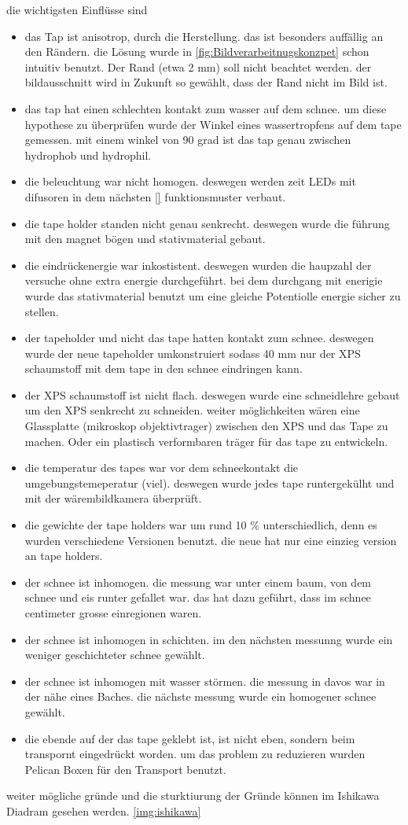 die wichtigsten Einflüsse sind
\begin{itemize}
\item das Tap ist anisotrop, durch die Herstellung. das ist besonders auffällig an den Rändern. die Lösung wurde in \ref{fig:Bildverarbeitnugskonzpet} schon intuitiv benutzt. Der Rand (etwa 2 mm) soll nicht beachtet werden. der bildausschnitt wird in Zukunft so gewählt, dass der Rand nicht im Bild ist.
\item das tap hat einen schlechten kontakt zum wasser auf dem schnee. um diese hypothese zu überprüfen wurde der Winkel eines wassertropfens auf dem tape gemessen. mit einem winkel von 90 grad ist das tap genau zwischen hydrophob und hydrophil.
\item die beleuchtung war nicht homogen. deswegen werden zeit LEDs mit difusoren in dem nächsten \ref{} funktionsmuster verbaut.
\item die tape holder standen nicht genau senkrecht. deswegen wurde die führung mit den magnet bögen und stativmaterial gebaut.
\item die eindrückenergie war inkostistent. deswegen wurden die haupzahl der versuche ohne extra energie durchgeführt. bei dem durchgang mit enerigie wurde das stativmaterial benutzt um eine gleiche Potentiolle energie sicher zu stellen.
\item der tapeholder und nicht das tape hatten kontakt zum schnee. deswegen wurde der neue tapeholder umkonstruiert sodass 40 mm nur der XPS schaumstoff mit dem tape in den schnee eindringen kann.
\item der XPS schaumstoff ist nicht flach. deswegen wurde eine schneidlehre gebaut um den XPS senkrecht  zu schneiden. weiter möglichkeiten wären eine Glassplatte (mikroskop objektivtrager) zwischen den XPS und das Tape zu machen. Oder ein plastisch verformbaren träger für das tape zu entwickeln.
\item die temperatur des tapes war vor dem schneekontakt die umgebungstemeperatur (viel). deswegen wurde jedes tape runtergekülht und mit der wärembildkamera überprüft.
\item die gewichte der tape holders war um rund 10 \% unterschiedlich, denn es wurden verschiedene Versionen benutzt. die neue hat nur eine einzieg version an tape holders.
\item der schnee ist inhomogen. die messung war unter einem baum, von dem schnee und eis runter gefallet war. das hat dazu geführt, dass im schnee centimeter grosse einregionen waren.
\item der schnee ist inhomogen in schichten. im den nächsten messunng wurde ein weniger geschichteter schnee gewählt.
\item der schnee ist inhomogen mit wasser störmen. die messung in davos war in der nähe eines Baches. die nächste messung wurde ein homogener schnee gewählt.
\item die ebende auf der das tape geklebt ist, ist nicht eben, sondern beim transpornt eingedrückt worden. um das problem zu reduzieren wurden Pelican Boxen für den Transport benutzt.
\end{itemize}

weiter mögliche gründe und die sturktiurung der Gründe können im Ishikawa Diadram gesehen werden. \ref{img:ishikawa}
